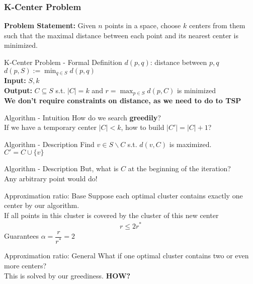 \documentclass{beamer}
\newcommand*{\brk}{\\[10pt]}
\begin{document}
\begin{frame}
    \frametitle{K-Center Problem}
    \textbf{Problem Statement:} Given $n$ points in a space, 
    choose $k$ centers from them such that the maximal distance between 
    each point and its nearest center is minimized. 
\end{frame}

\begin{frame}{K-Center Problem - Formal Definition}
    $d(p, q)$: distance between $p, q$ \\ 
    $d(p, S) := \min_{q \in S} d(p, q)$ \\
    \textbf{Input:} $S, k$ \\
    \textbf{Output:} $C \subseteq S$ s.t. $|C| = k$ and  $r = \max_{p \in S} d(p, C)$ 
    is minimized \\[20pt]
    \pause 
    \textbf{We don't require constraints on distance, as we need to do to TSP}
\end{frame}


\begin{frame}{Algorithm - Intuition}
    How do we search \textbf{greedily}? \\[10pt]
    If we have a temporary center $|C| < k$, how to build $|C'| = |C| + 1$?
\end{frame}

\begin{frame}{Algorithm - Description}
    Find $v \in S \backslash C$ s.t. $d(v, C)$ is maximized. \brk
    $C' = C \cup \{v\}$ \brk
\end{frame}

\begin{frame}{Algorithm - Description}
    But, what is $C$ at the beginning of the iteration? 
    \pause \brk
    Any arbitrary point would do!
\end{frame}

\begin{frame}{Approximation ratio: Base}
    Suppose each optimal cluster contains exactly one center by our algorithm.\brk
    \pause
    If all points in this cluster is covered by the cluster of this new center
    \begin{align*}
        r \leq 2r^*        
    \end{align*}
    \pause 
    Guarantees $\alpha = \dfrac{r}{r^*} = 2$ 
\end{frame}

\begin{frame}{Approximation ratio: General}
    What if one optimal cluster contains two or even more centers? \brk 
    This is solved by our greediness. \textbf{HOW?}
\end{frame}
\end{document}
